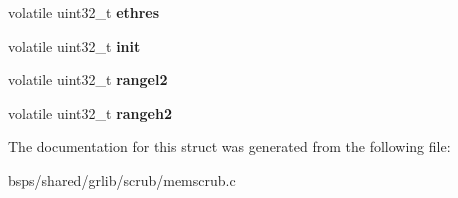\begin{DoxyCompactItemize}
\item 
\mbox{\label{structmemscrub__regs_a48e2540385c3cad92d837a9b70879643}} 
volatile uint32\+\_\+t {\bfseries ethres}
\item 
\mbox{\label{structmemscrub__regs_a9777c0871031f1891db45dbf04110ff7}} 
volatile uint32\+\_\+t {\bfseries init}
\item 
\mbox{\label{structmemscrub__regs_a90e3899dc7749c152ec1f76fa2fbfc5d}} 
volatile uint32\+\_\+t {\bfseries rangel2}
\item 
\mbox{\label{structmemscrub__regs_aa6d2c89878057357d7e88db43bbf0b2f}} 
volatile uint32\+\_\+t {\bfseries rangeh2}
\end{DoxyCompactItemize}


The documentation for this struct was generated from the following file\+:\begin{DoxyCompactItemize}
\item 
bsps/shared/grlib/scrub/memscrub.\+c\end{DoxyCompactItemize}
